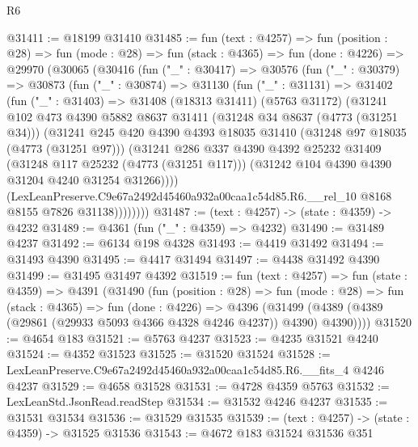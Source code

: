 \begin{lexlean}{R6}
\begin{coremodule}
@31411 := @18199 @31410
@31485 := fun (text : @4257) =>
  fun (position : @28) =>
  fun (mode : @28) =>
  fun (stack : @4365) =>
  fun (done : @4226) =>
  @29970
    (@30065
      (@30416
        (fun ("_" : @30417) =>
        @30576
          (fun ("_" : @30379) =>
          @30873
            (fun ("_" : @30874) =>
            @31130
              (fun ("_" : @31131) =>
              @31402
                (fun ("_" : @31403) =>
                @31408
                  (@18313 @31411)
                  (@5763 @31172)
                  (@31241
                    @102
                    @473
                    @4390
                    @5882
                    @8637
                    @31411
                    (@31248 @34 @8637 (@4773 (@31251 @34)))
                    (@31241
                      @245
                      @420
                      @4390
                      @4393
                      @18035
                      @31410
                      (@31248 @97 @18035 (@4773 (@31251 @97)))
                      (@31241
                        @286
                        @337
                        @4390
                        @4392
                        @25232
                        @31409
                        (@31248 @117 @25232 (@4773 (@31251 @117)))
                        (@31242 @104 @4390 @4390 @31204 @4240 @31254 @31266))))
                  (LexLeanPreserve.C9e67a2492d45460a932a00caa1c54d85.R6.__rel_10
                    @8168
                    @8155
                    @7826
                    @31138))))))))
@31487 := (text : @4257) -> (state : @4359) -> @4232
@31489 := @4361 (fun ("_" : @4359) => @4232)
@31490 := @31489 @4237
@31492 := @6134 @198 @4328
@31493 := @4419 @31492
@31494 := @31493 @4390
@31495 := @4417 @31494
@31497 := @4438 @31492 @4390
@31499 := @31495 @31497 @4392
@31519 := fun (text : @4257) =>
  fun (state : @4359) =>
  @4391
    (@31490
      (fun (position : @28) =>
      fun (mode : @28) =>
      fun (stack : @4365) =>
      fun (done : @4226) =>
      @4396 (@31499 (@4389 (@4389 (@29861 (@29933 @5093 @4366 @4328 @4246 @4237)) @4390) @4390))))
@31520 := @4654 @183
@31521 := @5763 @4237
@31523 := @4235 @31521 @4240
@31524 := @4352 @31523
@31525 := @31520 @31524
@31528 := LexLeanPreserve.C9e67a2492d45460a932a00caa1c54d85.R6.__fits_4 @4246 @4237
@31529 := @4658 @31528
@31531 := @4728 @4359 @5763
@31532 := LexLeanStd.JsonRead.readStep
@31534 := @31532 @4246 @4237
@31535 := @31531 @31534
@31536 := @31529 @31535
@31539 := (text : @4257) -> (state : @4359) -> @31525 @31536
@31543 := @4672 @183 @31524 @31536 @351

\end{coremodule}
\end{lexlean}
